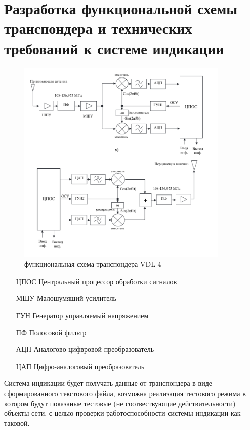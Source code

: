 \documentclass[a4paper,12pt]{report} %
\begin{document}
\section{Разработка функциональной схемы транспондера и технических требований к
  системе индикации} %
\begin{figure}[!ht]
\includegraphics[width=0.9\textwidth]{vdl4}
\caption{функциональная схема транспондера VDL-4}
\end{figure}

\begin{itemize}
\item [ЦПОС] Центральный процессор обработки сигналов
\item [МШУ] Малошумящий усилитель
\item [ГУН] Генератор управляемый напряжением
\item [ПФ] Полосовой фильтр
\item [АЦП] Аналогово-цифвровой преобразователь
\item [ЦАП] Цифро-аналоговый преобразователь
\end{itemize}
\newpage

Система индикации будет получать данные от транспондера в виде сформированного
текстового файла, возможна реализация тестового режима в котором будут показаные
тестовые (не соотвествующие действительности) объекты сети, с целью проверки
работоспособности системы индикации как таковой.
\end{document}
